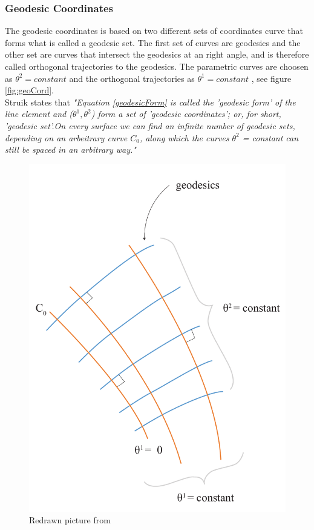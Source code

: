\subsubsection{Geodesic Coordinates}\label{sec:geoCord}

The geodesic coordinates is based on two different sets of coordinates curve that forms what is called a geodesic set. The first set of curves are geodesics and the other set are curves that intersect the geodesics at an right angle, and is therefore called orthogonal trajectories to the geodesics. The parametric curves are choosen as $\theta^2 = constant$ and the orthogonal trajectories as $\theta^1 =constant$ \cite{ref:Williams}, see figure \ref{fig:geoCord}. \\

 Struik\cite{ref:Struik} states that \textit{"Equation \ref{geodesicForm} is called the 'geodesic form' of the line element and ($\theta^1,\theta^2$) form a set of 'geodesic coordinates'; or, for short, 'geodesic set'.On every surface we can find an infinite number of geodesic sets, depending on an arbeitrary curve $C_0$, along which the curves $\theta^2$ = constant can still be spaced in an arbitrary way."}\\

\begin{figure}[H]
\centering
\includegraphics[height=0.8\linewidth ]{figure/Theory/geodesicCoordRe.pdf}
\caption{Redrawn picture from \cite{ref:Struik}  }
\label{fig:geodesicCoord}
\end{figure}


